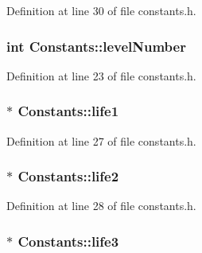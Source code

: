 Definition at line 30 of file constants.h.\hypertarget{class_constants_ad29cd8b25520469b86004002c69f57a6}{
\subsubsection[{levelNumber}]{\setlength{\rightskip}{0pt plus 5cm}int {\bf Constants::levelNumber}}}
\label{class_constants_ad29cd8b25520469b86004002c69f57a6}


Definition at line 23 of file constants.h.\hypertarget{class_constants_ab40abe96c335a7d98beb80da51e32e6a}{
\subsubsection[{life1}]{ $\ast$ {\bf Constants::life1}}}
\label{class_constants_ab40abe96c335a7d98beb80da51e32e6a}


Definition at line 27 of file constants.h.\hypertarget{class_constants_a70a4c2e4725758d9ee34a4424503e6f5}{
\subsubsection[{life2}]{ $\ast$ {\bf Constants::life2}}}
\label{class_constants_a70a4c2e4725758d9ee34a4424503e6f5}


Definition at line 28 of file constants.h.\hypertarget{class_constants_a7b43b0f6bf4e053d0d7ec448cebade42}{
\subsubsection[{life3}]{ $\ast$ {\bf Constants::life3}}}
\label{class_constants_a7b43b0f6bf4e053d0d7ec448cebade42}


